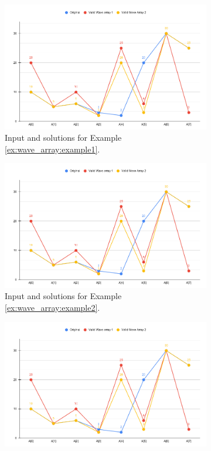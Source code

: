 \begin{figure}
	\centering
	\begin{subfigure}[t]{0.80\textwidth}
		\includegraphics[width=1\linewidth]{sources/wave_array/images/example1.png}
		\caption{Input and solutions for Example \ref{ex:wave_array:example1}.}
		\label{fig:dice_rolls:12faces_dice}
	 \end{subfigure}
	\hfill
	\begin{subfigure}[t]{0.80\textwidth}
		\includegraphics[width=1\linewidth]{sources/wave_array/images/example1.png}
		\caption{Input and solutions for Example \ref{ex:wave_array:example2}.}
		\label{fig:dice_rolls:6faces_dice}
	 \end{subfigure}
	 \hfill
	 \begin{subfigure}[t]{0.80\textwidth}
		 \includegraphics[width=1\linewidth]{sources/wave_array/images/example1.png}

\end{subfigure}
\end{figure}

